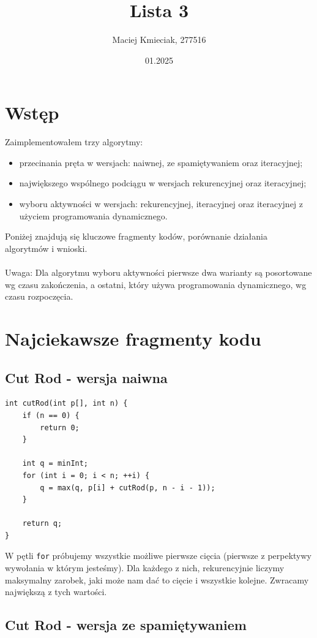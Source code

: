 \documentclass{article}
\title{Lista 3}
\author{Maciej Kmieciak, 277516}
\date{01.2025}
\begin{document}
\maketitle

\section{Wstęp}

Zaimplementowałem trzy algorytmy:
\begin{itemize}
    \item przecinania pręta w wersjach: naiwnej, ze spamiętywaniem oraz iteracyjnej;
    \item największego wspólnego podciągu w wersjach rekurencyjnej oraz iteracyjnej;
    \item wyboru aktywności w wersjach: rekurencyjnej, iteracyjnej oraz iteracyjnej z użyciem programowania dynamicznego.
\end{itemize}
Poniżej znajdują się kluczowe fragmenty kodów, porównanie działania algorytmów i wnioski. \\ \\
Uwaga: Dla algorytmu wyboru aktywności pierwsze dwa warianty są posortowane wg czasu zakończenia, a ostatni, który używa programowania dynamicznego, wg czasu rozpoczęcia.

\section{Najciekawsze fragmenty kodu}

\subsection{Cut Rod - wersja naiwna}

\begin{verbatim}
int cutRod(int p[], int n) {
    if (n == 0) {
        return 0;
    }

    int q = minInt;
    for (int i = 0; i < n; ++i) {
        q = max(q, p[i] + cutRod(p, n - i - 1));
    }

    return q;
}
\end{verbatim}

W pętli \texttt{for} próbujemy wszystkie możliwe pierwsze cięcia (pierwsze z perpektywy wywołania w którym jesteśmy). Dla każdego z nich, rekurencyjnie liczymy maksymalny zarobek, jaki może nam dać to cięcie i wszystkie kolejne. Zwracamy największą z tych wartości.

\subsection{Cut Rod - wersja ze spamiętywaniem}
\end{document}
